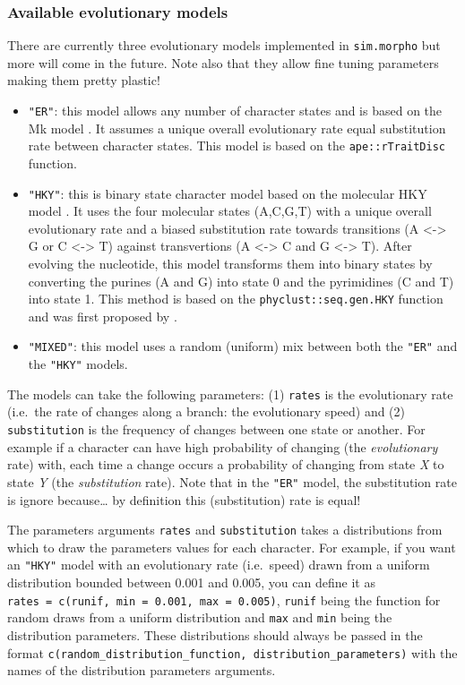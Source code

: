 \documentclass[]{book}
\providecommand{\tightlist}{%
  \setlength{\itemsep}{0pt}\setlength{\parskip}{0pt}}
\begin{document}
\hypertarget{available-evolutionary-models}{%
\subsubsection{Available evolutionary models}\label{available-evolutionary-models}}

There are currently three evolutionary models implemented in \texttt{sim.morpho} but more will come in the future.
Note also that they allow fine tuning parameters making them pretty plastic!

\begin{itemize}
\tightlist
\item
  \texttt{"ER"}: this model allows any number of character states and is based on the Mk model \citep{lewisa2001}. It assumes a unique overall evolutionary rate equal substitution rate between character states. This model is based on the \texttt{ape::rTraitDisc} function.
\item
  \texttt{"HKY"}: this is binary state character model based on the molecular HKY model \citep{HKY85}. It uses the four molecular states (A,C,G,T) with a unique overall evolutionary rate and a biased substitution rate towards transitions (A \textless{}-\textgreater{} G or C \textless{}-\textgreater{} T) against transvertions (A \textless{}-\textgreater{} C and G \textless{}-\textgreater{} T). After evolving the nucleotide, this model transforms them into binary states by converting the purines (A and G) into state 0 and the pyrimidines (C and T) into state 1. This method is based on the \texttt{phyclust::seq.gen.HKY} function and was first proposed by \citet{OReilly2016}.
\item
  \texttt{"MIXED"}: this model uses a random (uniform) mix between both the \texttt{"ER"} and the \texttt{"HKY"} models.
\end{itemize}

The models can take the following parameters:
(1) \texttt{rates} is the evolutionary rate (i.e.~the rate of changes along a branch: the evolutionary speed) and (2) \texttt{substitution} is the frequency of changes between one state or another.
For example if a character can have high probability of changing (the \emph{evolutionary} rate) with, each time a change occurs a probability of changing from state \emph{X} to state \emph{Y} (the \emph{substitution} rate).
Note that in the \texttt{"ER"} model, the substitution rate is ignore because\ldots{} by definition this (substitution) rate is equal!

The parameters arguments \texttt{rates} and \texttt{substitution} takes a distributions from which to draw the parameters values for each character.
For example, if you want an \texttt{"HKY"} model with an evolutionary rate (i.e.~speed) drawn from a uniform distribution bounded between 0.001 and 0.005, you can define it as \texttt{rates\ =\ c(runif,\ min\ =\ 0.001,\ max\ =\ 0.005)}, \texttt{runif} being the function for random draws from a uniform distribution and \texttt{max} and \texttt{min} being the distribution parameters.
These distributions should always be passed in the format \texttt{c(random\_distribution\_function,\ distribution\_parameters)} with the names of the distribution parameters arguments.
\end{document}

